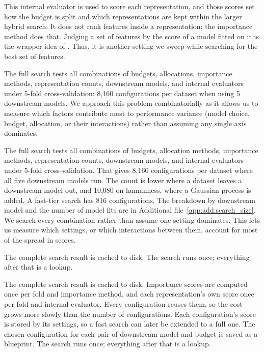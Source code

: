 This internal evaluator is used to score each representation, and those scores set how the budget is split and which representations are kept within the larger hybrid search. It does not rank features inside a representation; the importance method does that. Judging a set of features by the score of a model fitted on it is the wrapper idea of \citet{Kohavi1997}. Thus, it is another setting we sweep while searching for the best set of features.



The full search tests all combinations of budgets, allocations, importance methods, representation counts, downstream models, and internal evaluators under 5-fold cross-validation: 8,160 configurations per dataset when using 5 downstream models. We approach this problem combinatorially as it allows us to measure which factors contribute most to performance variance (model choice, budget, allocation, or their interactions) rather than assuming any single axis dominates.

The full search tests all combinations of budgets, allocation methods, importance methods, representation counts, downstream models, and internal evaluators under 5-fold cross-validation. That gives 8,160 configurations per dataset where all five downstream models run. The count is lower where a dataset leaves a downstream model out, and 10,080 on humanness, where a Gaussian process is added. A fast-tier search has 816 configurations. The breakdown by downstream model and the number of model fits are in Additional file~\ref{app:add:search_size}. We search every combination rather than assume one setting dominates. This lets us measure which settings, or which interactions between them, account for most of the spread in scores.


The complete search result is cached to disk. The search runs once; everything after that is a lookup.

The complete search result is cached to disk. Importance scores are computed once per fold and importance method, and each representation's own score once per fold and internal evaluator. Every configuration reuses them, so the cost grows more slowly than the number of configurations. Each configuration's score is stored by its settings, so a fast search can later be extended to a full one. The chosen configuration for each pair of downstream model and budget is saved as a blueprint. The search runs once; everything after that is a lookup.

